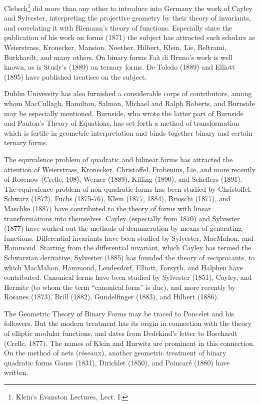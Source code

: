 \documentclass[oneside]{book}
\begin{document}
Clebsch\footnote{Klein's Evanston Lectures, Lect. I.} did more than
any other to introduce into Germany the work of Cayley and
Sylvester, interpreting the projective geometry by their theory of
invariants, and correlating it with Riemann's theory of
functions. Especially since the publication of his work on forms
(1871) the subject has attracted such scholars as Weierstrass,
Kronecker, Mansion, Noether, Hilbert, Klein, Lie, Beltrami,
Burkhardt, and many others. On binary forms Fa\`a di Bruno's work is
well known, as is Study's (1889) on ternary forms. De Toledo (1889)
and Elliott (1895) have published treatises on the subject.

Dublin University has also furnished a considerable corps of
contributors, among whom MacCullagh, Hamilton, Salmon, Michael and
Ralph Roberts, and Burnside may be especially mentioned. Burnside,
who wrote the latter part of Burnside and Panton's Theory of
Equations, has set forth a method of transformation which is fertile
in geometric interpretation and binds together binary and certain
ternary forms.

The equivalence problem of quadratic and bilinear forms has
attracted the attention of Weierstrass, Kronecker, Christoffel,
Frobenius, Lie, and more recently of Rosenow (Crelle, 108), Werner
(1889), Killing (1890), and Scheffers (1891). The equivalence
problem of non-quadratic forms has been studied by
Christoffel. Schwarz (1872), Fuchs (1875-76), Klein (1877, 1884),
Brioschi (1877), and Maschke (1887) have contributed to the theory
of forms with linear transformations into themselves. Cayley
(especially from 1870) and Sylvester (1877) have worked out the
methods of denumeration by means of generating
functions. Differential invariants have been studied by Sylvester,
MacMahon, and Hammond. Starting from the differential invariant,
which Cayley has termed the Schwarzian derivative, Sylvester (1885)
has founded the theory of reciprocants, to which MacMahon, Hammond,
Leudesdorf, Elliott, Forsyth, and Halphen have
contributed. Canonical forms have been studied by Sylvester (1851),
Cayley, and Hermite (to whom the term ``canonical form'' is due),
and more recently by Rosanes (1873), Brill (1882), Gundelfinger
(1883), and Hilbert (1886).

The Geometric Theory of Binary Forms may be traced to Poncelet and
his followers. But the modern treatment has its origin in connection
with the theory of elliptic modular functions, and dates from
Dedekind's letter to Borchardt (Crelle, 1877). The names of Klein
and Hurwitz are prominent in this connection. On the method of nets
(r\'eseaux), another geometric treatment of binary quadratic forms
Gauss (1831), Dirichlet (1850), and Poincar\'e (1880) have written.
\end{document}
